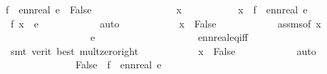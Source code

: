 \begin{isabellebody}
{\isachardoublequoteopen}f\ {\isacharminus}{\kern0pt}{\isacharbackquote}{\kern0pt}\ {\isacharbraceleft}{\kern0pt}ennreal\ e{\isacharbraceright}{\kern0pt}\ {\isasymsubseteq}\ {\isacharbraceleft}{\kern0pt}False{\isacharbraceright}{\kern0pt}{\isachardoublequoteclose}\isanewline
\ \ \ \ \ \ \isamarkupfalse%
\isanewline
\ \ \ \ \ \ \ \ \isamarkupfalse%
\ x\ \isanewline
\ \ \ \ \ \ \ \ \isamarkupfalse%
\ {\isachardoublequoteopen}x\ {\isasymin}\ f\ {\isacharminus}{\kern0pt}{\isacharbackquote}{\kern0pt}\ {\isacharbraceleft}{\kern0pt}ennreal\ e{\isacharbraceright}{\kern0pt}{\isachardoublequoteclose}\isanewline
\ \ \ \ \ \ \ \ \isamarkupfalse%
\ \isamarkupfalse%
\ {\isachardoublequoteopen}f\ x\ {\isacharequal}{\kern0pt}\ e{\isachardoublequoteclose}\isanewline
\ \ \ \ \ \ \ \ \ \ \isamarkupfalse%
\ auto\isanewline
\ \ \ \ \ \ \ \ \isamarkupfalse%
\ \isamarkupfalse%
\ {\isachardoublequoteopen}x\ {\isacharequal}{\kern0pt}\ False{\isachardoublequoteclose}\isanewline
\ \ \ \ \ \ \ \ \ \ \isamarkupfalse%
\ assms{\isacharparenleft}{\kern0pt}{}{\isacharparenright}{\kern0pt}{\isacharbrackleft}{\kern0pt}of\ x{\isacharbrackright}{\kern0pt}\ \isanewline
\ \ \ \ \ \ \ \ \ \ \ \ \ \ \ \ \ {\isacartoucheopen}e\ {\isachargreater}{\kern0pt}\ {}{\isacartoucheclose}\isanewline
\ \ \ \ \ \ \ \ \ \ \ \ \ \ \ \ \ \ ennreal{\isacharunderscore}{\kern0pt}eq{\isacharunderscore}{\kern0pt}{}{\isacharunderscore}{\kern0pt}iff\isanewline
\ \ \ \ \ \ \ \ \ \ \isamarkupfalse%
\ {\isacharparenleft}{\kern0pt}smt\ {\isacharparenleft}{\kern0pt}verit{\isacharcomma}{\kern0pt}\ best{\isacharparenright}{\kern0pt}\ mult{\isacharunderscore}{\kern0pt}zero{\isacharunderscore}{\kern0pt}right{\isacharparenright}{\kern0pt}\isanewline
\ \ \ \ \ \ \ \ \isamarkupfalse%
\ \isamarkupfalse%
\ {\isachardoublequoteopen}x\ {\isasymin}\ {\isacharbraceleft}{\kern0pt}False{\isacharbraceright}{\kern0pt}{\isachardoublequoteclose}\isanewline
\ \ \ \ \ \ \ \ \ \ \isamarkupfalse%
\ auto\isanewline
\ \ \ \ \ \ \isamarkupfalse%
\isanewline
\ \ \ \ \isamarkupfalse%
\ \isanewline
\ \ \ \ \ \ \isamarkupfalse%
\ {\isachardoublequoteopen}{\isacharbraceleft}{\kern0pt}False{\isacharbraceright}{\kern0pt}\ {\isasymsubseteq}\ f\ {\isacharminus}{\kern0pt}{\isacharbackquote}{\kern0pt}\ {\isacharbraceleft}{\kern0pt}ennreal\ e{\isacharbraceright}{\kern0pt}{\isachardoublequoteclose}\isanewline

\end{isabellebody}
